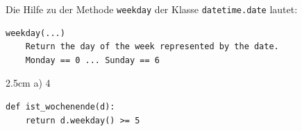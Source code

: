 \question[3]
Die Hilfe zu der Methode \texttt{weekday} der Klasse \texttt{datetime.date} lautet:
\begin{lstlisting}[language={}]
weekday(...)
    Return the day of the week represented by the date.
    Monday == 0 ... Sunday == 6
\end{lstlisting}
\begin{solutionbox}{2.5cm}
a) 4
\begin{lstlisting}
def ist_wochenende(d):
    return d.weekday() >= 5
\end{lstlisting}
\end{solutionbox}
